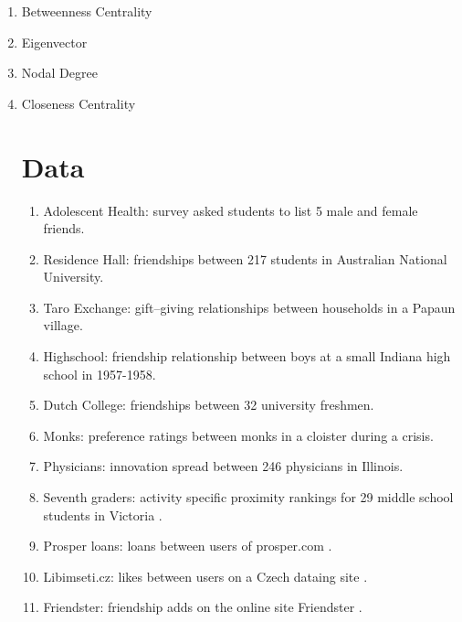 \documentclass[3p,times]{elsarticle}
\begin{document}
\begin{enumerate}
	\item Betweenness Centrality
	
	\item Eigenvector 
	
	\item Nodal Degree
	
	\item Closeness Centrality 
\section{Data}

\begin{enumerate}

    \item Adolescent Health: survey asked students to list 5 male and female friends. \cite{AdHealth}
    
    \item Residence Hall: friendships between 217 students in Australian National University. \cite{Res}
    
    \item Taro Exchange: gift--giving relationships between households in a Papaun village. \cite{Taro}

    \item Highschool: friendship relationship between boys at a small Indiana high school in 1957-1958. \cite{HS}
    
    \item Dutch College: friendships between 32 university freshmen. \cite{Dutch}
    
    \item Monks: preference ratings between monks in a cloister during a crisis. \cite{monks}
    
    \item Physicians: innovation spread between 246 physicians in Illinois. \cite{docs}
    
    \item Seventh graders: activity specific proximity rankings for 29 middle school students in Victoria \cite{sevies}.
    
    \item Prosper loans: loans between users of prosper.com \cite{prosper}.
    
    \item Libimseti.cz: likes between users on a Czech dataing site \cite{libi}.
    
    \item Friendster: friendship adds on the online site Friendster \cite{friendster}.
    

\end{enumerate}
\end{enumerate}
\end{document}
